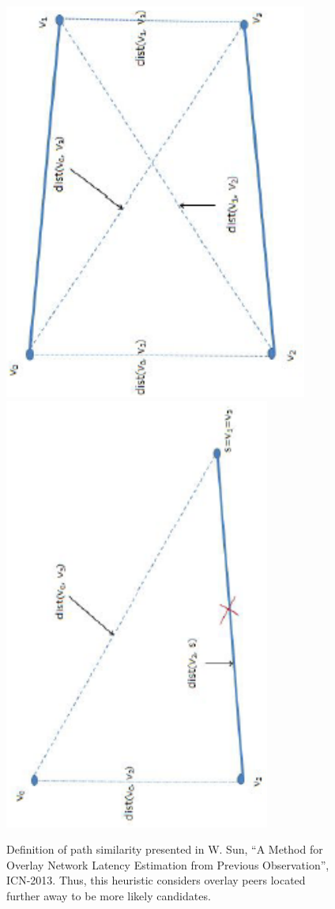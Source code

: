 \documentclass[conference]{IEEEtran}
\begin{document}
\begin{figure}[htbp]
\begin{center}
\includegraphics[scale=0.7,angle=-90]{../../images/external/location_routing/path_similarity_two_destinations}
\includegraphics[scale=0.7,angle=-90]{../../images/external/location_routing/path_similarity_one_destination}
\caption{Definition of path similarity presented in W. Sun, ``A Method for Overlay Network Latency Estimation from Previous Observation'', ICN-2013. Thus, this heuristic considers overlay peers located further away to be more likely candidates.}
\end{center}
\end{figure}
%
\end{document}
